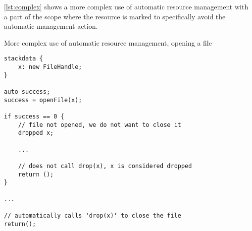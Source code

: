 \cref{lst:complex} shows a more complex use of automatic resource management with a part of the scope where the resource is marked to specifically avoid the automatic management action.


\begin{codex}
    \caption{More complex use of automatic resource management, opening a file}
    \label{lst:complex}
    \begin{lstlisting}
stackdata {
    x: new FileHandle;
}

auto success;
success = openFile(x);

if success == 0 {
    // file not opened, we do not want to close it
    dropped x;

    ...

    // does not call drop(x), x is considered dropped
    return ();
}

...

// automatically calls 'drop(x)' to close the file
return();
    \end{lstlisting}
\end{codex}
